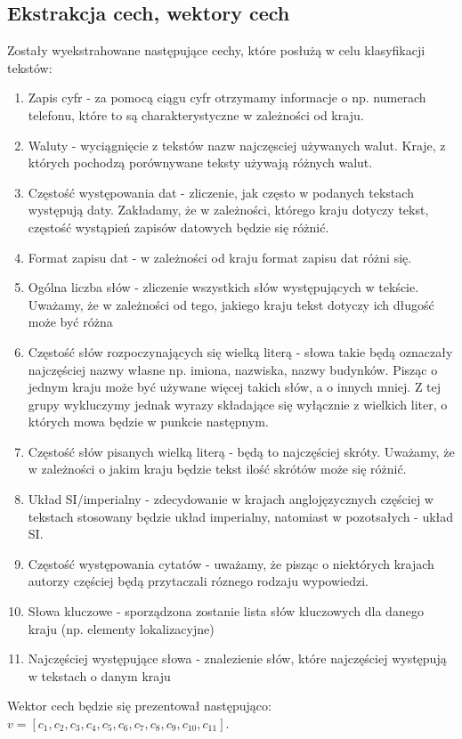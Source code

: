 \documentclass{classrep}
\begin{document}
\subsection{Ekstrakcja cech, wektory cech}
Zostały wyekstrahowane następujące cechy, które posłużą w celu klasyfikacji tekstów:
\begin{enumerate}
    \item Zapis cyfr - za pomocą ciągu cyfr otrzymamy informacje o np. numerach telefonu, które to są charakterystyczne w zależności od kraju.
    \item Waluty - wyciągnięcie z tekstów nazw najczęsciej używanych walut. Kraje, z których pochodzą porównywane teksty używają różnych walut.
    \item Częstość występowania dat - zliczenie, jak często w podanych tekstach występują daty. Zakładamy, że w zależności, którego kraju dotyczy tekst, częstość wystąpień zapisów datowych będzie się różnić.
    \item Format zapisu dat - w zależności od kraju format zapisu dat różni się.
    \item Ogólna liczba słów - zliczenie wszystkich słów występujących w tekście. Uważamy, że w zależności od tego, jakiego kraju tekst dotyczy ich długość może być różna
    \item Częstość słów rozpoczynających się wielką literą - słowa takie będą oznaczały najczęściej  nazwy własne np. imiona, nazwiska, nazwy budynków. Pisząc o jednym kraju może być używane więcej takich słów, a o innych mniej. Z tej grupy wykluczymy jednak wyrazy składające się wyłącznie z wielkich liter, o których mowa będzie w punkcie następnym.
    \item Częstość słów pisanych wielką literą - będą to najczęściej skróty. Uważamy, że w zależności o jakim kraju będzie tekst ilość skrótów może się różnić.
    \item Układ SI/imperialny - zdecydowanie w krajach anglojęzycznych częściej w tekstach stosowany będzie układ imperialny, natomiast w pozotsałych - układ SI.
    \item Częstość występowania cytatów - uważamy, że pisząc o niektórych krajach autorzy częściej będą przytaczali róznego rodzaju wypowiedzi.
    \item Słowa kluczowe - sporządzona zostanie lista słów kluczowych dla danego kraju (np. elementy lokalizacyjne)
    \item Najczęściej występujące słowa - znalezienie słów, które najczęściej występują w tekstach o danym kraju
\end{enumerate}
Wektor cech będzie się prezentował następująco: 
$ v = [c_{1}, c_{2}, c_{3}, c_{4}, c_{5}, c_{6}, c_{7}, c_{8}, c_{9}, c_{10}, c_{11}] $.
\end{document}
